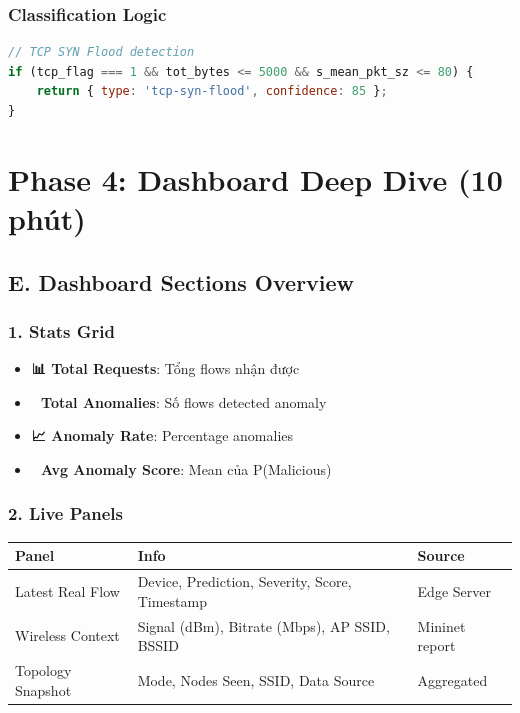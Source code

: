 \documentclass[12pt,a4paper]{article}
\begin{document}
\subsubsection{Classification Logic}
\begin{lstlisting}[language=javascript]
// TCP SYN Flood detection
if (tcp_flag === 1 && tot_bytes <= 5000 && s_mean_pkt_sz <= 80) {
    return { type: 'tcp-syn-flood', confidence: 85 };
}
\end{lstlisting}

\section{Phase 4: Dashboard Deep Dive (10 phút)}

\subsection{E. Dashboard Sections Overview}

\subsubsection{1. Stats Grid}
\begin{itemize}
    \item \textbf{📊 Total Requests}: Tổng flows nhận được
    \item \textbf{🚨 Total Anomalies}: Số flows detected anomaly
    \item \textbf{📈 Anomaly Rate}: Percentage anomalies
    \item \textbf{🎯 Avg Anomaly Score}: Mean của P(Malicious)
\end{itemize}

\subsubsection{2. Live Panels}
\begin{table}[h]
\centering
\begin{tabularx}{\textwidth}{|l|X|X|}
\hline
\textbf{Panel} & \textbf{Info} & \textbf{Source} \\
\hline
Latest Real Flow & Device, Prediction, Severity, Score, Timestamp & Edge Server \\
\hline
Wireless Context & Signal (dBm), Bitrate (Mbps), AP SSID, BSSID & Mininet report \\
\hline
Topology Snapshot & Mode, Nodes Seen, SSID, Data Source & Aggregated \\
\hline
\end{tabularx}
\end{table}
\end{document}
